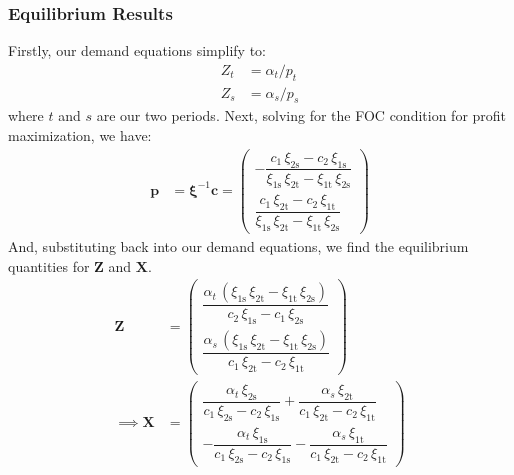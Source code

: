 \documentclass[11pt,a4paper,leqno]{extarticle}
\begin{document}
	\subsubsection{Equilibrium Results}
	
	Firstly, our demand equations simplify to:
	\begin{align}
	Z_t &= \alpha_t / p_t \\
	Z_s &= \alpha_s / p_s
	\end{align}
	where $t$ and $s$ are our two periods. Next, solving for the FOC condition for profit maximization, we have:
	\begin{align}
	\mathbf{p} &=  \boldsymbol{\xi}^{-1} \mathbf{c} = \begin{pmatrix}
	-\dfrac{c_{1}\,\xi _{\mathrm{2s}}-c_{2}\,\xi _{\mathrm{1s}}}{\xi _{\mathrm{1s}}\,\xi _{\mathrm{2t}}-\xi _{\mathrm{1t}}\,\xi _{\mathrm{2s}}}  \\[2ex]
	\dfrac{c_{1}\,\xi _{\mathrm{2t}}-c_{2}\,\xi _{\mathrm{1t}}}{\xi _{\mathrm{1s}}\,\xi _{\mathrm{2t}}-\xi _{\mathrm{1t}}\,\xi _{\mathrm{2s}}} 
	\end{pmatrix} 
	\end{align}
	And, substituting back into our demand equations, we find the equilibrium quantities for $\mathbf{Z}$ and $\mathbf{X}$. 
	\begin{align}
	\mathbf{Z} &= \begin{pmatrix}
	\dfrac{\alpha _{t}\,\left(\xi _{\mathrm{1s}}\,\xi _{\mathrm{2t}}-\xi _{\mathrm{1t}}\,\xi _{\mathrm{2s}}\right)}{c_{2}\,\xi _{\mathrm{1s}} - c_{1}\,\xi _{\mathrm{2s}}} \\[2ex]
	\dfrac{\alpha _{s}\,\left(\xi _{\mathrm{1s}}\,\xi _{\mathrm{2t}}-\xi _{\mathrm{1t}}\,\xi _{\mathrm{2s}}\right)}{c_{1}\,\xi _{\mathrm{2t}}-c_{2}\,\xi _{\mathrm{1t}}} 
	\end{pmatrix}\\
	\implies 
	\mathbf{X} &= \begin{pmatrix}
	\dfrac{\alpha _{t}\,\xi _{\mathrm{2s}}}{c_{1}\,\xi _{\mathrm{2s}}-c_{2}\,\xi _{\mathrm{1s}}}+\dfrac{\alpha _{s}\,\xi _{\mathrm{2t}}}{c_{1}\,\xi _{\mathrm{2t}}-c_{2}\,\xi _{\mathrm{1t}}} \\[2ex] 
	-\dfrac{\alpha _{t}\,\xi _{\mathrm{1s}}}{c_{1}\,\xi _{\mathrm{2s}}-c_{2}\,\xi _{\mathrm{1s}}}-\dfrac{\alpha _{s}\,\xi _{\mathrm{1t}}}{c_{1}\,\xi _{\mathrm{2t}}-c_{2}\,\xi _{\mathrm{1t}}}
	\end{pmatrix}
	\end{align}
\end{document}
